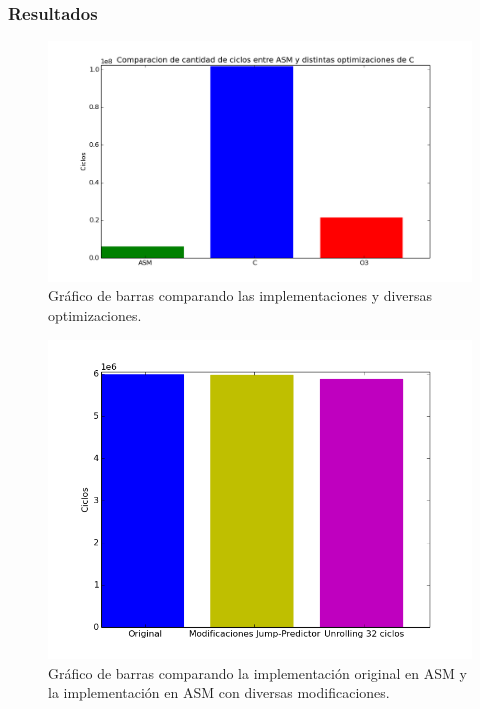 \subsubsection{Resultados}

\begin{figure}[h!]
\centering
\captionsetup{justification=centering}
	\includegraphics[width = 15 cm, height = 8 cm]{imagenes/ColorizarASMvsC.png}
	\caption[center]{Gráfico de barras comparando las implementaciones y diversas optimizaciones.}
\end{figure}

\medskip

\begin{figure}[h!]
\centering
\captionsetup{justification=centering}
	\includegraphics[width = 16 cm, height = 10 cm]{imagenes/jmpunro.png}
	\caption[center]{Gráfico de barras comparando la implementación original en ASM y la implementación en ASM con diversas modificaciones.}
\end{figure}
	

